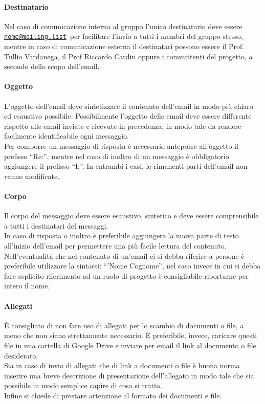 \documentclass[float=false, crop=false]{standalone}
\makeatletter
\newcommand{\mail}[1]{\href{mailto:#1}{\texttt{#1}}}
\newcommand{\mailinglist}{\mail{nome@mailing.list}}
\makeatother
\begin{document}
		\paragraph{Destinatario}
		Nel caso di comunicazione interna al gruppo l'unico destinatario deve essere \mailinglist\ per facilitare l'invio a tutti i membri del gruppo stesso, mentre in caso di comunicazione esterna il destinatari possono essere il Prof. Tullio Vardanega, il Prof Riccardo Cardin oppure i committenti del progetto, a secondo dello scopo dell'email.
		\paragraph{Oggetto}
		L'oggetto dell'email deve sintetizzare il contenuto dell'email in modo più chiaro ed esaustivo possibile. Possibilmente l'oggetto delle email deve essere differente rispetto alle email inviate e ricevute in precedenza, in modo tale da rendere facilmente identificabile ogni messaggio. \\ Per comporre un messaggio di risposta è necessario anteporre all'oggetto il prefisso ``Re:'', mentre nel caso di inoltro di un messaggio è obbligatorio aggiungere il prefisso ``I:''. In entrambi i casi, le rimanenti parti dell'email non vanno modificate.
		\paragraph{Corpo}
		Il corpo del messaggio deve essere esaustivo, sintetico e deve essere comprensibile a tutti i destinatari del messaggi. \\ In caso di risposta o inoltro è preferibile aggiungere la nuova parte di testo all'inizio dell'email per permettere una più facile lettura del contenuto. \\ Nell'eventualità che nel contenuto di un'email ci si debba riferire a persone è preferibile utilizzare la sintassi: ``'Nome Cognome'', nel caso invece in cui si debba fare esplicito riferimento ad un ruolo di progetto è consigliabile riportarne per intero il nome.
		\paragraph{Allegati}
		È consigliato di non fare uso di allegati per lo scambio di documenti o file, a meno che non siano strettamente necessario. È preferibile, invece, caricare questi file in una cartella di Google Drive e inviare per email il link al documento o file desiderato. \\ Sia in caso di invio di allegati che di link a documenti o file è buona norma inserire una breve descrizione di presentazione dell'allegato in modo tale che sia possibile in modo semplice capire di cosa si tratta. \\ Infine si chiede di prestare attenzione al formato dei documenti e file.
\end{document}
